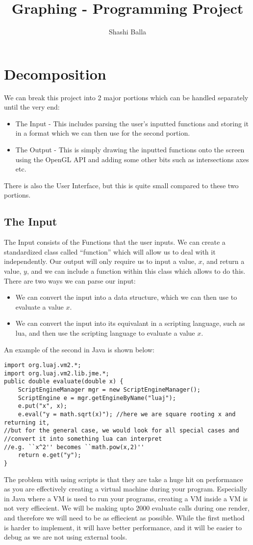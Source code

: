 \documentclass{article}
\author{Shashi Balla}
\title{Graphing - Programming Project}
\begin{document}
\maketitle

\tableofcontents
\newpage
\section{Decomposition}
We can break this project into 2 major portions which can be handled separately until the very end:
\begin{itemize}
	\item The Input - This includes parsing the user's inputted functions and storing it in a format which we can then use for the second portion.
	\item The Output - This is simply drawing the inputted functions onto the screen using the OpenGL API and adding some other bits such as intersections axes etc.
\end{itemize}
There is also the User Interface, but this is quite small compared to these two portions.
\subsection{The Input}
The Input consists of the Functions that the user inputs. We can create a standardized class called ``function''  which will allow us to deal with it independently. Our output will only require us to input a value, $x$, and return a value, $y$, and we can include a function within this class which allows to do this. There are two ways we can parse our input:
\begin{itemize}
	\item We can convert the input into a data structure, which we can then use to evaluate a value $x$.
	\item We can convert the input into its equivalant in a scripting language, such as lua, and then use the scripting language to evaluate a value $x$.
\end{itemize}
An example of the second in Java is shown below:
\begin{verbatim}
import org.luaj.vm2.*;
import org.luaj.vm2.lib.jme.*;
public double evaluate(double x) {
   	ScriptEngineManager mgr = new ScriptEngineManager();
	ScriptEngine e = mgr.getEngineByName("luaj");
	e.put("x", x);
	e.eval("y = math.sqrt(x)");	//here we are square rooting x and returning it, 
//but for the general case, we would look for all special cases and
//convert it into something lua can interpret
//e.g. ``x^2'' becomes ``math.pow(x,2)''
	return e.get("y");	
}
\end{verbatim}
The problem with using scripts is that they are take a huge hit on performance as you are effectively creating a virtual machine during your program. Especially in Java where a VM is used to run your programs, creating a VM inside a VM is not very effiecient. We will be making upto 2000 evaluate calls during one render, and therefore we will need to be as effiecient as possible. While the first method is harder to implement, it will have better performance, and it will be easier to debug as we are not using external tools.
\newpage
\end{document}
